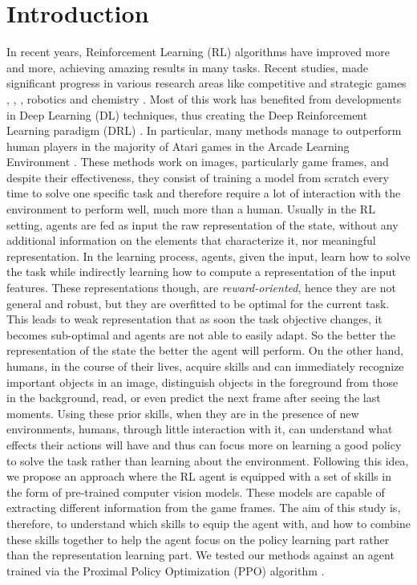 
\chapter{Introduction}
\label{sec:introduction}


In recent years, Reinforcement Learning (RL) \cite{sutton1998introduction} algorithms have improved more and more, achieving amazing results in many tasks.
Recent studies, made significant progress in various research areas like competitive and strategic games \cite{mnih2013playing}, \cite{badia2020agent57}, \cite{vinyals2019grandmaster}, robotics \cite{bousmalis2023robocat} and chemistry \cite{varadi2022alphafold}.
Most of this work has benefited from developments in Deep Learning (DL) techniques, thus creating the Deep Reinforcement Learning paradigm (DRL) \cite{zhang2020deep}.
In particular, many methods manage to outperform human players in the majority of Atari games in the Arcade Learning Environment \cite{bellemare13arcade}.
These methods work on images, particularly game frames, and despite their effectiveness, they consist of training a model from scratch every time to solve one specific task and therefore require a lot of interaction with the environment to perform well, much more than a human.
Usually in the RL setting, agents are fed as input the raw representation of the state, without any additional information on the elements that characterize it, nor meaningful representation. In the learning process, agents, given the input, learn how to solve the task while indirectly learning how to compute a representation of the input features. These representations though, are \textit{reward-oriented}, hence they are not general and robust, but they are overfitted to be optimal for the current task. This leads to weak representation that as soon the task objective changes, it becomes sub-optimal and agents are not able to easily adapt. So the better the representation of the state the better the agent will perform.
On the other hand, humans, in the course of their lives, acquire skills and can immediately recognize important objects in an image, distinguish objects in the foreground from those in the background, read, or even predict the next frame after seeing the last moments.
Using these prior skills, when they are in the presence of new environments, humans, through little interaction with it, can understand what effects their actions will have and thus can focus more on learning a good policy to solve the task rather than learning about the environment.
Following this idea, we propose an approach where the RL agent is equipped with a set of skills in the form of pre-trained computer vision models. These models are capable of extracting different information from the game frames.
The aim of this study is, therefore, to understand which skills to equip the agent with, and how to combine these skills together to help the agent focus on the policy learning part rather than the representation learning part.
We tested our methods against an agent trained via the Proximal Policy Optimization (PPO) algorithm \cite{schulman2017proximal}.


